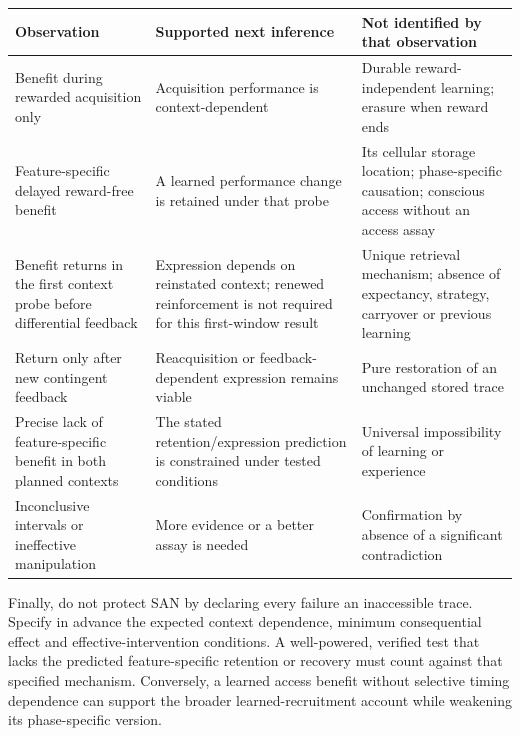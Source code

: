 \documentclass[
  american,
  11pt,
  letterpaper,
]{article}
\newcounter{none} %
\begin{document}
{\def\LTcaptype{none} %
\begin{longtable}[]{@{}
  >{\raggedright\arraybackslash}p{}
  >{\raggedright\arraybackslash}p{}
  >{\raggedright\arraybackslash}p{}@{}}
\toprule\noalign{}
\begin{minipage}[b]{\linewidth}\raggedright
Observation
\end{minipage} & \begin{minipage}[b]{\linewidth}\raggedright
Supported next inference
\end{minipage} & \begin{minipage}[b]{\linewidth}\raggedright
Not identified by that observation
\end{minipage} \\
\midrule\noalign{}
\endhead
\bottomrule\noalign{}
\endlastfoot
Benefit during rewarded acquisition only & Acquisition performance is context-dependent & Durable reward-independent learning; erasure when reward ends \\
Feature-specific delayed reward-free benefit & A learned performance change is retained under that probe & Its cellular storage location; phase-specific causation; conscious access without an access assay \\
Benefit returns in the first context probe before differential feedback & Expression depends on reinstated context; renewed reinforcement is not required for this first-window result & Unique retrieval mechanism; absence of expectancy, strategy, carryover or previous learning \\
Return only after new contingent feedback & Reacquisition or feedback-dependent expression remains viable & Pure restoration of an unchanged stored trace \\
Precise lack of feature-specific benefit in both planned contexts & The stated retention/expression prediction is constrained under tested conditions & Universal impossibility of learning or experience \\
Inconclusive intervals or ineffective manipulation & More evidence or a better assay is needed & Confirmation by absence of a significant contradiction \\
\end{longtable}
}

Finally, do not protect SAN by declaring every failure an inaccessible trace. Specify in advance the expected context dependence, minimum consequential effect and effective-intervention conditions. A well-powered, verified test that lacks the predicted feature-specific retention or recovery must count against that specified mechanism. Conversely, a learned access benefit without selective timing dependence can support the broader learned-recruitment account while weakening its phase-specific version.
\end{document}

